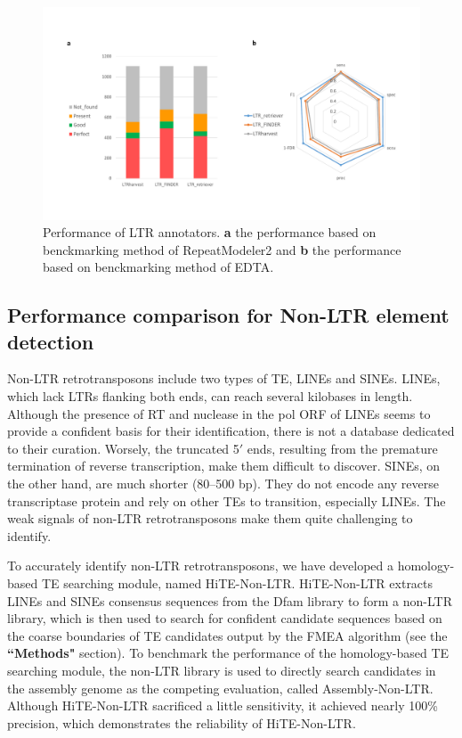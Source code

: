 \documentclass{bmcart}
\begin{document}
\begin{figure}[h!]
	\centerline{\includegraphics[width=1.0\textwidth]{figures/LTRResults.pdf}}
	\caption{Performance of LTR annotators. \textbf{a} the performance based on benckmarking method of RepeatModeler2 and \textbf{b} the performance based on benckmarking method of EDTA.}
	\label{fig:ltr_results}
\end{figure}


\subsection*{Performance comparison for Non-LTR element detection}
Non-LTR retrotransposons include two types of TE, LINEs and SINEs\cite{zhao2016makes}. LINEs, which lack LTRs flanking both ends, can reach several kilobases in length. Although the presence of RT and nuclease in the pol ORF of LINEs seems to provide a confident basis for their identification, there is not a database dedicated to their curation. Worsely, the truncated 5$'$ ends, resulting from the premature termination of reverse transcription, make them difficult to discover. SINEs, on the other hand, are much shorter (80–500 bp)\cite{wicker2007unified}. They do not encode any reverse transcriptase protein and rely on other TEs to transition, especially LINEs\cite{dewannieux2003line}. The weak signals of non-LTR retrotransposons make them quite challenging to identify\cite{mao2017sine_scan}.

To accurately identify non-LTR retrotransposons, we have developed a homology-based TE searching module, named HiTE-Non-LTR. HiTE-Non-LTR extracts LINEs and SINEs consensus sequences from the Dfam library to form a non-LTR library, which is then used to search for confident candidate sequences based on the coarse boundaries of TE candidates output by the FMEA algorithm (see the \textbf{``Methods"} section). To benchmark the performance of the homology-based TE searching module, the non-LTR library is used to directly search candidates in the assembly genome as the competing evaluation, called Assembly-Non-LTR. Although HiTE-Non-LTR sacrificed a little sensitivity, it achieved nearly 100\% precision, which demonstrates the reliability of HiTE-Non-LTR.
\end{document}
